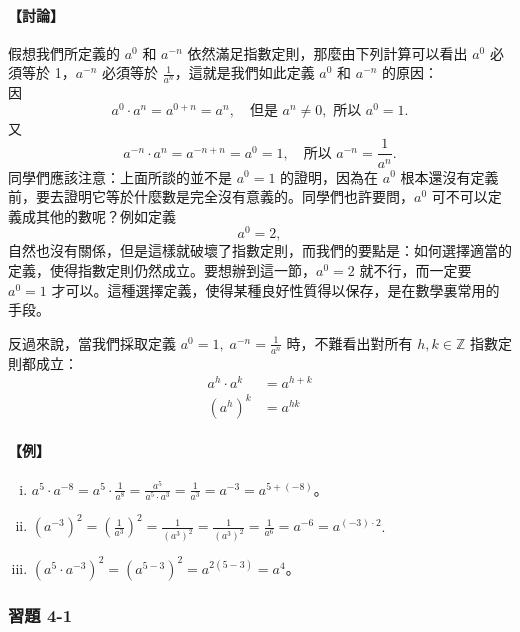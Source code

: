 \paragraph{【討論】} 假想我們所定義的 $a^0$ 和 $a^{-n}$ 依然滿足指數定則，那麼由下列計算可以看出 $a^0$ 必須等於 1，$a^{-n}$ 必須等於 $\frac{1}{a^n}$，這就是我們如此定義 $a^0$ 和 $a^{-n}$ 的原因：\\
因
\[
a^0 \cdot a^n = a^{0+n} = a^n, \quad \text{但是 } a^n \neq 0, \text{ 所以 } a^0 = 1.
\]
又
\[
a^{-n} \cdot a^n = a^{-n+n} = a^0 = 1, \quad \text{所以 } a^{-n} = \frac{1}{a^n}.
\]
同學們應該注意：上面所談的並不是 $a^0 = 1$ 的證明，因為在 $a^0$ 根本還沒有定義前，要去證明它等於什麼數是完全沒有意義的。同學們也許要問，$a^0$ 可不可以定義成其他的數呢？例如定義
\[
a^0 = 2,
\]
自然也沒有關係，但是這樣就破壞了指數定則，而我們的要點是：如何選擇適當的定義，使得指數定則仍然成立。要想辦到這一節，$a^0 = 2$ 就不行，而一定要 $a^0 = 1$ 才可以。這種選擇定義，使得某種良好性質得以保存，是在數學裏常用的手段。

反過來說，當我們採取定義 $a^0 = 1,\; a^{-n} = \frac{1}{a^n}$ 時，不難看出對所有 $h, k \in \mathbb{Z}$ 指數定則都成立：
\begin{align}
a^h \cdot a^k &= a^{h+k} \label{eq:b2-ch4-int-exp-1} \\
(a^h)^k &= a^{hk} \label{eq:b2-ch4-int-exp-2}
\end{align}

\paragraph{【例】}
\begin{enumerate}[(i)]
    \item $a^5 \cdot a^{-8} = a^5 \cdot \frac{1}{a^8} = \frac{a^5}{a^5 \cdot a^3} = \frac{1}{a^3} = a^{-3} = a^{5+(-8)}$。
    \item $(a^{-3})^2 = \left(\frac{1}{a^3}\right)^2 = \frac{1}{(a^3)^2} = \frac{1}{(a^3)^2} = \frac{1}{a^6} = a^{-6} = a^{(-3)\cdot 2}$\label{note:b2-ch4-p81-duplicate}.
    \item $(a^5 \cdot a^{-3})^2 = (a^{5-3})^2 = a^{2(5-3)} = a^4$。
\end{enumerate}

\subsubsection*{習題 4-1}

